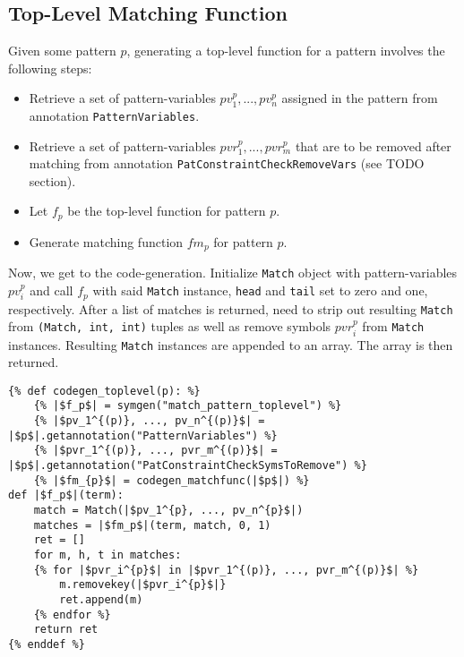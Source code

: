 \subsection{Top-Level Matching Function}
Given some pattern $p$, generating a top-level function for a pattern involves the following steps: 

\begin{itemize}
\item Retrieve a set of pattern-variables $pv_1^{p}, ..., pv_n^{p}$ assigned in the pattern from annotation \texttt{PatternVariables}.
\item Retrieve a set of pattern-variables $pvr_1^{p}, ..., pvr_m^{p}$ that are to be removed after matching from annotation \texttt{PatConstraintCheckRemoveVars} (see TODO section).
\item Let $f_p$ be the top-level function for pattern $p$.
\item Generate matching function $fm_p$ for pattern $p$.
\end{itemize}

Now, we get to the code-generation. Initialize \texttt{Match} object with pattern-variables $pv_i^{p}$ and call $f_p$ with said \texttt{Match} instance, \texttt{head} and \texttt{tail} set to zero and one, respectively. After a list of matches is returned, need to strip out resulting \texttt{Match} from \texttt{(Match, int, int)}  tuples as well as remove symbols $pvr_i^{p}$ from \texttt{Match} instances. Resulting \texttt{Match} instances are appended to an array. The array is then returned.


\begin{verbatim}
{% def codegen_toplevel(p): %}
	{% |$f_p$| = symgen("match_pattern_toplevel") %}
	{% |$pv_1^{(p)}, ..., pv_n^{(p)}$| = |$p$|.getannotation("PatternVariables") %}
	{% |$pvr_1^{(p)}, ..., pvr_m^{(p)}$| = |$p$|.getannotation("PatConstraintCheckSymsToRemove") %}
	{% |$fm_{p}$| = codegen_matchfunc(|$p$|) %}
def |$f_p$|(term):
	match = Match(|$pv_1^{p}, ..., pv_n^{p}$|)
	matches = |$fm_p$|(term, match, 0, 1)
	ret = []
	for m, h, t in matches:
	{% for |$pvr_i^{p}$| in |$pvr_1^{(p)}, ..., pvr_m^{(p)}$| %}
		m.removekey(|$pvr_i^{p}$|}
		ret.append(m)
	{% endfor %}
	return ret
{% enddef %}
\end{verbatim} 
